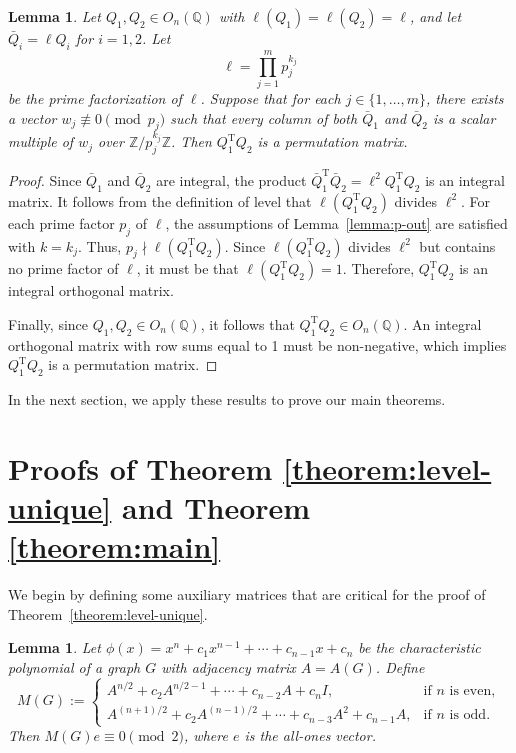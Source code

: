 \documentclass[12pt]{article}
\theoremstyle{plain}
\newtheorem{lemma}[theorem]{Lemma}
\theoremstyle{definition}
\newcommand{\trans}{^{\mathrm{T}}}
\begin{document}
\begin{lemma}
\label{lemma:same-level}
Let $Q_1, Q_2 \in O_n(\mathbb{Q})$ with $\ell(Q_1)=\ell(Q_2)=\ell$, and let $\bar Q_i=\ell Q_i$ for $i=1,2$. Let
$$\ell=\prod_{j=1}^m p_j^{k_j}$$
be the prime factorization of $\ell$. Suppose that for each $j \in \{1, \dots, m\}$, there exists a vector $w_j \not\equiv 0\pmod {p_j}$ such that every column of both $\bar Q_1$ and $\bar Q_2$ is a scalar multiple of $w_j$ over $\mathbb Z/p_j^{k_j}\mathbb Z$. Then $Q_1\trans Q_2$ is a permutation matrix.
\end{lemma}
\begin{proof}
Since $\bar{Q}_1$ and $\bar{Q}_2$ are integral, the product $\bar{Q}_1\trans \bar{Q}_2=\ell^2 Q_1\trans Q_2$ is an integral matrix. It follows from the definition of level that $\ell(Q_1\trans Q_2)$ divides $\ell^2$. For each prime factor $p_j$ of $\ell$, the assumptions of Lemma~\ref{lemma:p-out} are satisfied with $k=k_j$. Thus, $p_j \nmid \ell(Q_1\trans Q_2)$. Since $\ell(Q_1\trans Q_2)$ divides $\ell^2$ but contains no prime factor of $\ell$, it must be that $\ell(Q_1\trans Q_2) = 1$. Therefore, $Q_1\trans Q_2$ is an integral orthogonal matrix.

Finally, since $Q_1, Q_2 \in O_n(\mathbb{Q})$, it follows that $Q_1\trans Q_2 \in O_n(\mathbb{Q})$. An integral orthogonal matrix with row sums equal to 1 must be non-negative, which implies $Q_1\trans Q_2$ is a permutation matrix.
\end{proof}

In the next section, we apply these results to prove our main theorems.

\section{Proofs of Theorem \ref{theorem:level-unique}  and Theorem \ref{theorem:main}}
\label{section:proofs}

We begin by defining some auxiliary matrices that are critical for the proof of Theorem~\ref{theorem:level-unique}.

\begin{lemma}\cite{wang2017simple}
\label{lemma:wang-mod2}
Let $\phi(x) = x^n + c_1 x^{n-1} + \cdots + c_{n-1} x + c_n$ be the characteristic polynomial of a graph $G$ with adjacency matrix $A=A(G)$. Define
$$
M(G) :=
\begin{cases}
A^{n/2} + c_2 A^{n/2-1} + \cdots + c_{n-2} A + c_n I, & \text{if $n$ is even}, \\
A^{(n+1)/2} + c_2 A^{(n-1)/2} + \cdots + c_{n-3} A^2 + c_{n-1} A, & \text{if $n$ is odd}.
\end{cases}
$$
Then $M(G) e \equiv 0 \pmod{2}$, where $e$ is the all-ones vector.
\end{lemma}
\end{document}
